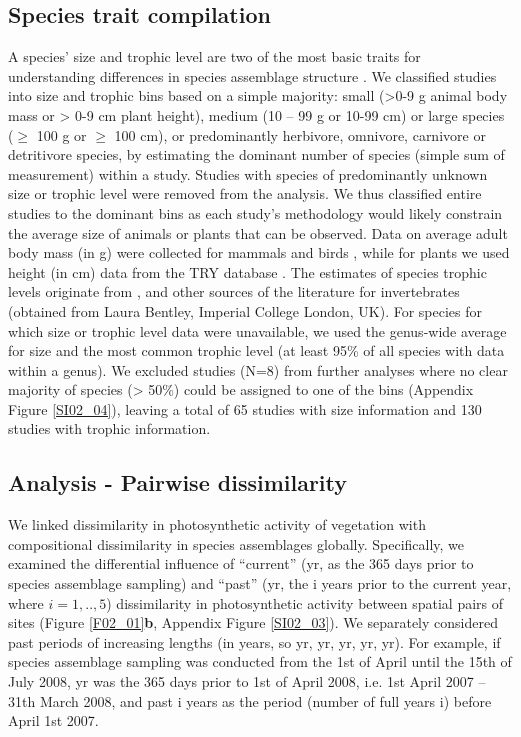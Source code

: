 \subsection{Species trait compilation}
\label{C02_0203}
A species’ size and trophic level are two of the most basic traits for understanding differences in species assemblage structure \citep{Speakman2005,Terborgh2015}. We classified studies into size and trophic bins based on a simple majority: small (>0-9 g animal body mass or > 0-9 cm plant height), medium (10 – 99 g or 10-99 cm) or large species ($\geq$ 100 g or $\geq$ 100 cm), or predominantly herbivore, omnivore, carnivore or detritivore species, by estimating the dominant number of species (simple sum of measurement) within a study. Studies with species of predominantly unknown size or trophic level were removed from the analysis. We thus classified entire studies to the dominant bins as each study’s methodology would likely constrain the average size of animals or plants that can be observed. Data on average adult body mass (in g) were collected for mammals \citep{Jones2009} and birds \citep{Myhrvold2015}, while for plants we used height (in cm) data from the TRY database \citep{Kattge2011}. The estimates of species trophic levels originate from \cite{Kissling2014}, \cite{Wilman2014} and other sources of the literature for invertebrates (obtained from Laura Bentley, Imperial College London, UK). For species for which size or trophic level data were unavailable, we used the genus-wide average for size and the most common trophic level (at least 95\% of all species with data within a genus). We excluded studies (N=8) from further analyses where no clear majority of species (> 50\%) could be assigned to one of the bins (Appendix Figure \ref{SI02_04}), leaving a total of 65 studies with size information and 130 studies with trophic information. 

\subsection{Analysis - Pairwise dissimilarity}
\label{C02_0204}
We linked dissimilarity in photosynthetic activity of vegetation with compositional dissimilarity in species assemblages globally. Specifically, we examined the differential influence of “current” (yr, as the 365 days prior to species assemblage sampling) and “past” (yr, the i years prior to the current year, where $i = 1,..,5$) dissimilarity in photosynthetic activity between spatial pairs of sites (Figure \ref{F02_01}\textbf{b}, Appendix Figure \ref{SI02_03}). We separately considered past periods of increasing lengths (in years, so yr, yr, yr, yr, yr). For example, if species assemblage sampling was conducted from the 1st of April until the 15th of July 2008, yr was the 365 days prior to 1st of April 2008, i.e. 1st April 2007 – 31th March 2008, and past i years as the period (number of full years i) before April 1st 2007.

